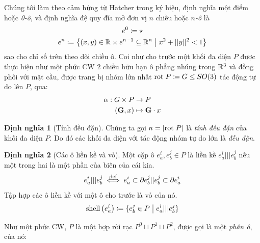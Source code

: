 \documentclass{article}
\theoremstyle{plain}
\theoremstyle{definition}
\newtheorem*{definition}{Định nghĩa}
\begin{document}
Chúng tôi làm theo cảm hứng từ Hatcher \cite{MR1867354} trong ký hiệu, định nghĩa một điểm hoặc \emph{0-ô}, và định nghĩa đệ quy đĩa mở đơn vị $n$ chiều hoặc \emph{$n$-ô} là
\begin{gather}
    e^0\coloneqq \star\\
    e^n\coloneqq \left\{(x,y)\in \mathbb{R}\times e^{n-1}\subseteq \mathbb{R}^n\hspace{1mm}\big|\hspace{1mm} x^2+||y||^2<1\right\}
\end{gather}
sao cho chỉ số trên theo dõi chiều ô. 
Coi như cho trước một khối đa diện $P$ được thực hiện như một phức CW 2 chiều hữu hạn ô phẳng nhúng trong $\mathbb{R}^3$ và đồng phôi với mặt cầu, được trang bị nhóm lớn nhất $\mathrm{rot}\hspace{1mm}P \coloneqq G\leq SO(3)$ tác động tự do lên $P$, qua: 
\begin{align}
    \alpha: G\times P&\to P\\
    (\mathbf{G},x)&\mapsto \mathbf{G}\cdot x\nonumber
\end{align}
\begin{definition}[Tính đều đặn]
    Chúng ta gọi $n=|\mathrm{rot}\hspace{1mm}P|$ là \emph{tính đều đặn} của khối đa diện $P$. Do đó các khối đa diện với tác động nhóm tự do lớn là \emph{đều đặn}.
\end{definition}
\begin{definition}[Các ô liền kề và vỏ]
    Một cặp ô $e^i_a, e^j_b\in P$ là liền kề $e^i_a ||| e^j_b$ nếu một trong hai là một phần của biên của cái kia. 
    \begin{equation}
        e^i_a ||| e^j_b \overset{\mathrm{def}}{\iff} e^i_a \subset \partial e^j_b || e^j_b\subset\partial e^i_a
    \end{equation}
    Tập hợp các ô liền kề với một ô cho trước là vỏ của nó.
    \begin{equation}
        \mathrm{shell}\left(e^i_a\right)\coloneqq \{e^j_b\in P\hspace{1mm}\big|\hspace{1mm} e^i_a|||e^j_b\}
    \end{equation}
\end{definition}
Như một phức CW, $P$ là một hợp rời rạc $P^0\sqcup P^1\sqcup P^2$, được gọi là một \emph{phân ô}, của nó: 
\end{document}
